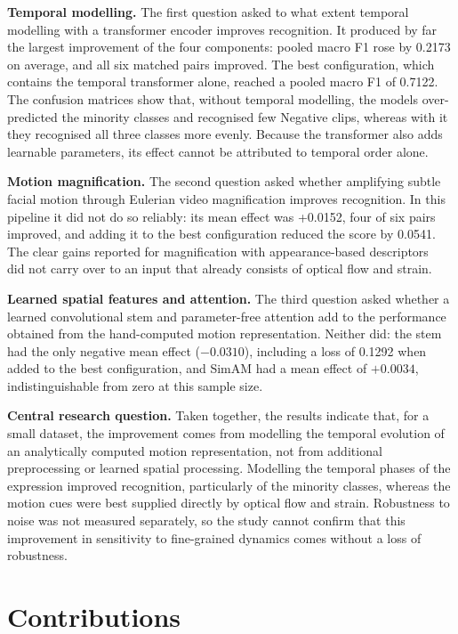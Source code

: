 \textbf{Temporal modelling.} The first question asked to what extent temporal modelling with a transformer encoder improves recognition. It produced by far the largest improvement of the four components: pooled macro F1 rose by 0.2173 on average, and all six matched pairs improved. The best configuration, which contains the temporal transformer alone, reached a pooled macro F1 of 0.7122. The confusion matrices show that, without temporal modelling, the models over-predicted the minority classes and recognised few Negative clips, whereas with it they recognised all three classes more evenly. Because the transformer also adds learnable parameters, its effect cannot be attributed to temporal order alone.

\textbf{Motion magnification.} The second question asked whether amplifying subtle facial motion through Eulerian video magnification improves recognition. In this pipeline it did not do so reliably: its mean effect was +0.0152, four of six pairs improved, and adding it to the best configuration reduced the score by 0.0541. The clear gains reported for magnification with appearance-based descriptors~\cite{liX2018,bai2021} did not carry over to an input that already consists of optical flow and strain.

\textbf{Learned spatial features and attention.} The third question asked whether a learned convolutional stem and parameter-free attention add to the performance obtained from the hand-computed motion representation. Neither did: the stem had the only negative mean effect ($-0.0310$), including a loss of 0.1292 when added to the best configuration, and SimAM had a mean effect of $+0.0034$, indistinguishable from zero at this sample size.

\textbf{Central research question.} Taken together, the results indicate that, for a small dataset, the improvement comes from modelling the temporal evolution of an analytically computed motion representation, not from additional preprocessing or learned spatial processing. Modelling the temporal phases of the expression improved recognition, particularly of the minority classes, whereas the motion cues were best supplied directly by optical flow and strain. Robustness to noise was not measured separately, so the study cannot confirm that this improvement in sensitivity to fine-grained dynamics comes without a loss of robustness.


\section{Contributions}
\label{sec:contributions}

